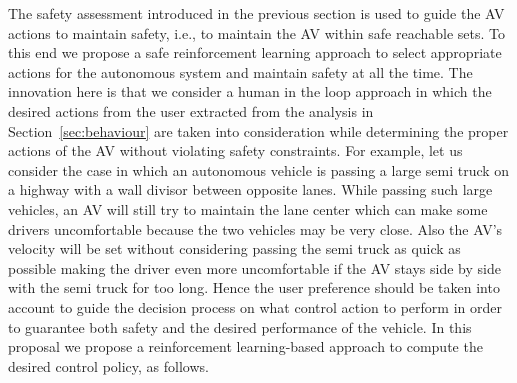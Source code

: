 The safety assessment introduced in the previous section is used to guide the AV actions to maintain safety, i.e., to maintain the AV within safe reachable sets. To this end we propose a safe reinforcement learning approach to select appropriate actions for the autonomous system and maintain safety at all the time. The innovation here is that we consider a human in the loop approach in which the desired actions from the user extracted from the analysis in Section~\ref{sec:behaviour} are taken into consideration while determining the proper actions of the AV without violating safety constraints. For example, let us consider the case in which an autonomous vehicle is passing a large semi truck on a highway with a wall divisor between opposite lanes. While passing such large vehicles, an AV will still try to maintain the lane center which can make some drivers uncomfortable because the two vehicles may be very close. Also the AV's velocity will be set without considering passing the semi truck as quick as possible making the driver even more uncomfortable if the AV stays side by side with the semi truck for too long. Hence the user preference should be taken into account to guide the decision process on what control action to perform in order to guarantee both safety and the desired performance of the vehicle. In this proposal we propose a reinforcement learning-based approach to compute the desired control policy, as follows.

